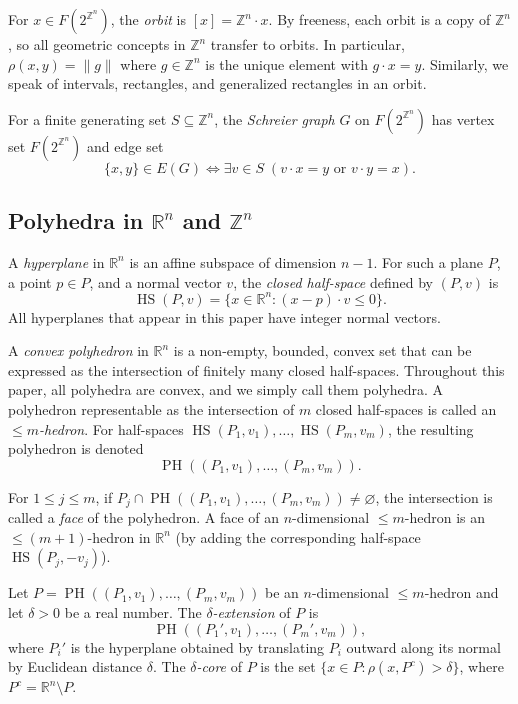 \documentclass[10pt,a4paper]{amsart}
\newcommand{\R}{\mathbb R}
\begin{document}
For $x\in F(2^{\mathbb{Z}^n})$, the {\em orbit} is $[x]=\mathbb{Z}^n\cdot x$.
By freeness, each orbit is a copy of $\mathbb{Z}^n$, so all geometric
concepts in $\mathbb{Z}^n$ transfer to orbits. In particular,
$\rho(x,y)=\|g\|$ where $g\in\mathbb{Z}^n$ is the unique element with
$g\cdot x=y$. Similarly, we speak of intervals, rectangles, and generalized
rectangles in an orbit.

For a finite generating set $S\subseteq \mathbb{Z}^n$, the {\em Schreier
graph} $G$ on $F(2^{\mathbb{Z}^n})$ has vertex set $F(2^{\mathbb{Z}^n})$
and edge set
\[
\{x,y\}\in E(G)\iff \exists v\in S\;(v\cdot x=y\text{ or }v\cdot y=x).
\]

\subsection{Polyhedra in $\mathbb{R}^n$ and $\mathbb{Z}^n$}\label{sec:polyhedra}

A {\em hyperplane} in $\mathbb{R}^n$ is an affine subspace
of dimension $n-1$. For such a plane $P$, a point $p\in P$, and a normal
vector $v$, the {\em closed half-space} defined by $(P,v)$ is
\[
\operatorname{HS}(P,v)=\{x\in\mathbb{R}^n\colon (x-p)\cdot v\leq 0\}.
\]
All hyperplanes that appear in this paper have integer normal vectors.

A {\em convex polyhedron} in $\mathbb{R}^n$ is a non-empty, bounded, convex
set that can be expressed as the intersection of finitely many closed
half-spaces. Throughout this paper, all polyhedra are convex, and we simply
call them polyhedra. A polyhedron representable as the intersection of $m$
closed half-spaces is called an {\em $\leq\!\! m$-hedron}. For half-spaces
$\operatorname{HS}(P_1,v_1),\dots,\operatorname{HS}(P_m,v_m)$, the resulting
polyhedron is denoted $$\operatorname{PH}((P_1,v_1),\dots,(P_m,v_m)).$$

For $1\leq j\leq m$, if
$P_j\cap \operatorname{PH}((P_1,v_1),\dots,(P_m,v_m))\neq\varnothing$,
the intersection is called a {\em face} of the polyhedron. A face of an
$n$-dimensional $\leq\!\! m$-hedron is an $\leq\!\! (m+1)$-hedron in $\R^n$ (by adding the corresponding half-space $\operatorname{HS}(P_j,-v_j)$).

Let $P=\operatorname{PH}((P_1,v_1),\dots,(P_m,v_m))$ be an $n$-dimensional
$\leq\!\!\! m$-hedron and let $\delta>0$ be a real number. The
{\em $\delta$-extension} of $P$ is
\[
\operatorname{PH}((P_1',v_1),\dots,(P_m',v_m)),
\]
where $P_i'$ is the hyperplane obtained by translating $P_i$
outward along its normal by Euclidean distance $\delta$. The
{\em $\delta$-core} of $P$ is the set
$\{x\in P\colon \rho(x, P^c)>\delta\}$, where
$P^c=\mathbb{R}^n\setminus P$.
\end{document}
